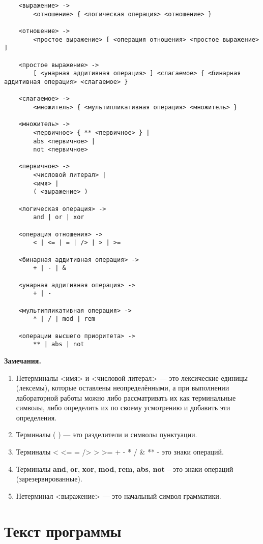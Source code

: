 \documentclass{bmstu-gost-7-32}
\begin{document}
\begin{verbatim}
	<выражение> ->
	    <отношение> { <логическая операция> <отношение> }

	<отношение> ->
	    <простое выражение> [ <операция отношения> <простое выражение> ]

	<простое выражение> ->
	    [ <унарная аддитивная операция> ] <слагаемое> { <бинарная аддитивная операция> <слагаемое> }

	<слагаемое> ->
	    <множитель> { <мультипликативная операция> <множитель> }

	<множитель> ->
	    <первичное> { ** <первичное> } |
	    abs <первичное> |
	    not <первичное>

	<первичное> ->
	    <числовой литерал> |
	    <имя> |
	    ( <выражение> )

	<логическая операция> ->
	    and | or | xor

	<операция отношения> ->
	    < | <= | = | /> | > | >=

	<бинарная аддитивная операция> ->
	    + | - | &

	<унарная аддитивная операция> ->
	    + | -

	<мультипликативная операция> ->
	    * | / | mod | rem

	<операции высшего приоритета> ->
	    ** | abs | not
\end{verbatim}

\textbf{Замечания.}

\begin{enumerate}
	\item Нетерминалы <имя> и <числовой литерал> — это лексические единицы (лексемы), которые оставлены неопределёнными, а при выполнении лабораторной работы можно либо рассматривать их как терминальные символы, либо определить их по своему усмотрению и добавить эти определения.
	\item Терминалы ( ) — это разделители и символы пунктуации.
	\item Терминалы < <= = /> > >= + - * / \& ** - это знаки операций.
	\item Терминалы \textbf{and}, \textbf{or}, \textbf{xor}, \textbf{mod}, \textbf{rem}, \textbf{abs}, \textbf{not} – это знаки операций (зарезервированные).
	\item Нетерминал <выражение> — это начальный символ грамматики.
\end{enumerate}

\section*{Текст программы}
\end{document}
